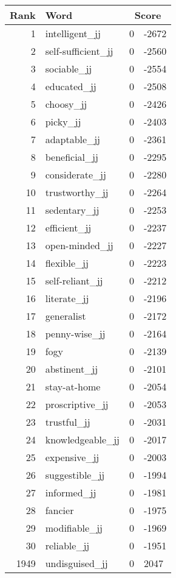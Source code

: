 \begin{longtable}[!htbp]{| rlr@{.}l |}
    \hline
    \textbf{Rank} & \textbf{Word} & \multicolumn{2}{c|}{\textbf{Score}} \\
    \hline
    \endhead
    1 & intelligent\_jj & 0 & -2672 \\
    2 & self-sufficient\_jj & 0 & -2560 \\
    3 & sociable\_jj & 0 & -2554 \\
    4 & educated\_jj & 0 & -2508 \\
    5 & choosy\_jj & 0 & -2426 \\
    6 & picky\_jj & 0 & -2403 \\
    7 & adaptable\_jj & 0 & -2361 \\
    8 & beneficial\_jj & 0 & -2295 \\
    9 & considerate\_jj & 0 & -2280 \\
    10 & trustworthy\_jj & 0 & -2264 \\
    11 & sedentary\_jj & 0 & -2253 \\
    12 & efficient\_jj & 0 & -2237 \\
    13 & open-minded\_jj & 0 & -2227 \\
    14 & flexible\_jj & 0 & -2223 \\
    15 & self-reliant\_jj & 0 & -2212 \\
    16 & literate\_jj & 0 & -2196 \\
    17 & generalist & 0 & -2172 \\
    18 & penny-wise\_jj & 0 & -2164 \\
    19 & fogy & 0 & -2139 \\
    20 & abstinent\_jj & 0 & -2101 \\
    21 & stay-at-home & 0 & -2054 \\
    22 & proscriptive\_jj & 0 & -2053 \\
    23 & trustful\_jj & 0 & -2031 \\
    24 & knowledgeable\_jj & 0 & -2017 \\
    25 & expensive\_jj & 0 & -2003 \\
    26 & suggestible\_jj & 0 & -1994 \\
    27 & informed\_jj & 0 & -1981 \\
    28 & fancier & 0 & -1975 \\
    29 & modifiable\_jj & 0 & -1969 \\
    30 & reliable\_jj & 0 & -1951 \\
    1949 & undisguised\_jj & 0 & 2047 \\

\end{longtable}
